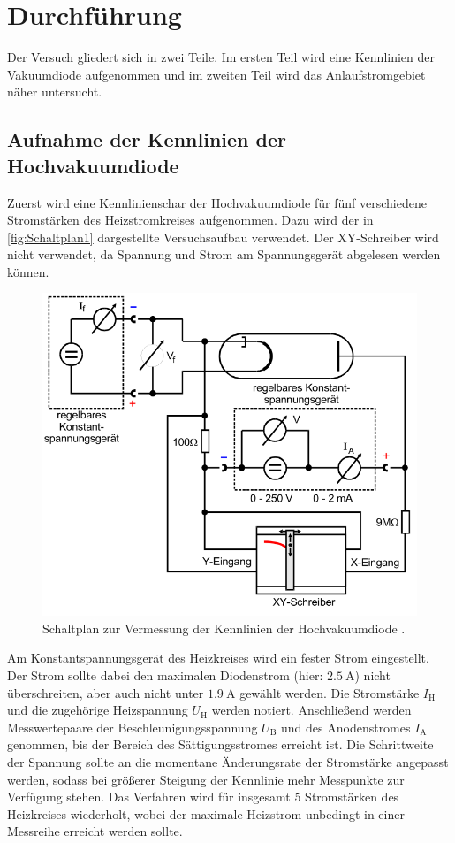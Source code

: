 \section{Durchführung}
\label{sec:Durchführung}
Der Versuch gliedert sich in zwei Teile. Im ersten Teil wird eine Kennlinien der Vakuumdiode aufgenommen und im zweiten Teil wird das Anlaufstromgebiet näher untersucht.

\subsection{Aufnahme der Kennlinien der Hochvakuumdiode}
\label{subsec:D_Kennlinie}
Zuerst wird eine Kennlinienschar der Hochvakuumdiode für fünf verschiedene Stromstärken des Heizstromkreises aufgenommen. Dazu wird der in \autoref{fig:Schaltplan1}
dargestellte Versuchsaufbau verwendet. Der XY-Schreiber wird nicht verwendet, da Spannung und Strom am Spannungsgerät abgelesen werden können.

\begin{figure}
    \centering
    \includegraphics[width = .6\textwidth]{content/Schaltplan1.png}
    \caption{Schaltplan zur Vermessung der Kennlinien der Hochvakuumdiode \cite{v504}.}
    \label{fig:Schaltplan1}
\end{figure}

Am Konstantspannungsgerät des Heizkreises wird ein fester Strom eingestellt. Der Strom sollte dabei den maximalen Diodenstrom (hier: $\qty{2.5}{\ampere}$) nicht überschreiten,
aber auch nicht unter $\qty{1.9}{\ampere}$ gewählt werden. Die Stromstärke $I_\text{H}$ und die zugehörige Heizspannung $U_\text{H}$ werden notiert. Anschließend werden Messwertepaare
der Beschleunigungsspannung $U_\text{B}$ und des Anodenstromes $I_\text{A}$ genommen, bis der Bereich des Sättigungsstromes erreicht ist. Die Schrittweite der Spannung 
sollte an die momentane Änderungsrate der Stromstärke angepasst werden, sodass bei größerer Steigung der Kennlinie mehr Messpunkte zur Verfügung stehen. Das Verfahren wird für
insgesamt 5 Stromstärken des Heizkreises wiederholt, wobei der maximale Heizstrom unbedingt in einer Messreihe erreicht werden sollte.

